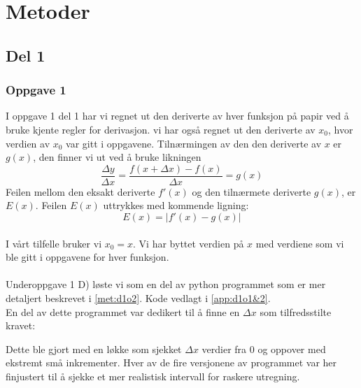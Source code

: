 \chapter{Metoder}
\section{Del 1}
\subsection{Oppgave 1}\label{met:d1o1}
I oppgave 1 del 1 har vi regnet ut den deriverte av hver funksjon på papir ved å bruke kjente regler for derivasjon.
vi har også regnet ut den deriverte av \(x_{0}\), hvor verdien av \(x_{0}\) var gitt i oppgavene. Tilnærmingen av den den deriverte av $x$ er $g(x)$, den finner vi ut ved å bruke likningen  \[\frac{\Delta y}{\Delta x} =\frac{f(x+ \Delta x)-f(x)}{\Delta x} = g(x)\]
Feilen mellom den eksakt deriverte $f'(x)$ og den tilnærmete deriverte $g(x)$, er $E(x)$. Feilen $E(x)$ uttrykkes med kommende ligning:
\\
\[E(x) = |f'(x) - g(x)|\]
\\
I vårt tilfelle bruker vi \(x_{0} =  x\). Vi har byttet verdien på $x$ med verdiene som vi ble gitt i oppgavene for hver funksjon.
\\
\\
Underoppgave 1 D) løste vi som en del av python programmet som er mer detaljert beskrevet i \ref{met:d1o2}. Kode vedlagt i \ref{app:d1o1&2}.\\
En del av dette programmet var dedikert til å finne en $\Delta x$ som tilfredsstilte kravet:\begin{center}\end{center}Dette ble gjort med en løkke som sjekket $\Delta x$ verdier fra 0 og oppover med ekstremt små inkrementer. Hver av de fire versjonene av programmet var her finjustert til å sjekke et mer realistisk intervall for raskere utregning.
\\
